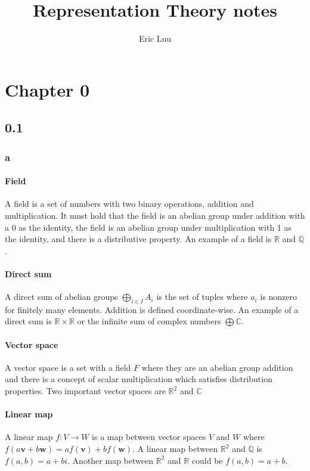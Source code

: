 \documentclass[]{article}
\title{Representation Theory notes}
\author{Eric Luu}
\begin{document}
\maketitle

\section*{Chapter 0}

\subsection*{0.1}
\subsubsection*{a}
\paragraph{Field} A field is a set of numbers with two binary operations, addition and multiplication. It must hold that the field is an abelian group under addition with a $0$ as the identity, the field is an abelian group under multiplication with 1 as the identity, and there is a distributive property.  An example of a field is $\mathbb{R}$ and $\mathbb{Q}$. 
\paragraph{Direct sum} A direct sum of abelian groups $\bigoplus_{i \in I} A_i$ is the set of tuples where $a_i$ is nonzero for finitely many elements. Addition is defined coordinate-wise. An example of a direct sum is $\mathbb{R} \times \mathbb{R}$ or the infinite sum of complex numbers $\bigoplus \mathbb{C}$.
\paragraph{Vector space} A vector space is a set with a field $F$ where they are an abelian group addition and there is a concept of scalar multiplication which satisfies distribution properties. Two important vector spaces are $\mathbb{R}^2$ and $\mathbb{C}$ 
\paragraph{Linear map} A linear map $f : V \rightarrow W$ is a map between vector spaces $V$ and $W$ where $f(a \bm{v} + b \bm{w})  = a f(\bm{v}) + b f(\bm{w})$. A linear map between $\mathbb{R}^2$ and $\mathbb{Q}$ is $f(a, b) = a + bi$. Another map between $\mathbb{R}^2$ and $\mathbb{R}$ could be $f(a, b) = a + b$.  
\end{document}
